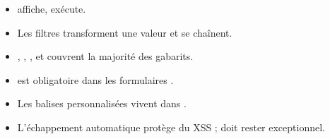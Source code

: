\begin{retenir}
\begin{itemize}
  \item {} affiche,  exécute.
  \item Les filtres transforment une valeur et se chaînent.
  \item {}, , ,  et  couvrent
        la majorité des gabarits.
  \item {} est obligatoire dans les formulaires .
  \item Les balises personnalisées vivent dans .
  \item L'échappement automatique protège du XSS ;  doit rester
        exceptionnel.
\end{itemize}
\end{retenir}

